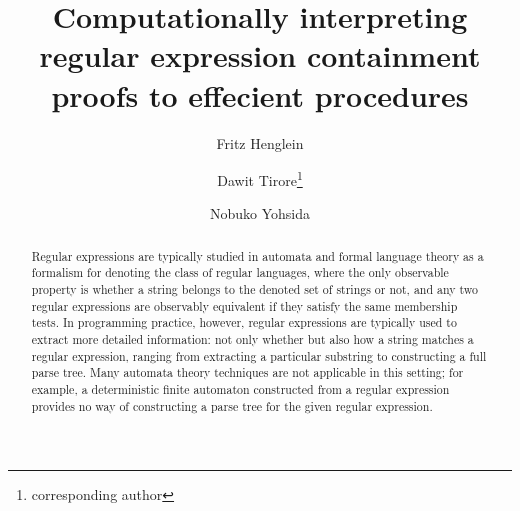 \documentclass[a4paper,UKenglish,cleveref, autoref, thm-restate]{lipics-v2021}
\title{Computationally interpreting regular expression containment proofs to effecient procedures } %
\author{Fritz Henglein}{University of Copenhagen, Denmark}{johnqpublic@dummyuni.org}{https://orcid.org/0000-0002-1825-0097}{(Optional) author-specific funding acknowledgements}%
\author{Dawit Tirore\footnote{corresponding author}}{IT University of Copenhagen, Dummy College, [optional: Address], Country}{dati@itu.dk}{[orcid]}{[funding]}
\author{Nobuko Yohsida}{University of Oxford}{mail}{[orcid]}{}
\begin{document}


\maketitle

\begin{abstract}
 Regular expressions are typically studied in automata and formal language theory as a formalism for denoting the class of regular languages, where the only observable property is whether a string belongs to the denoted set of strings or not, and any two regular expressions are observably equivalent if they satisfy the same membership tests.  In programming practice, however, regular expressions are typically used to extract more detailed information: not only whether but also how a string matches a regular expression, ranging from extracting a particular substring to constructing a full parse tree. Many automata theory techniques are not applicable in this setting; for example, a deterministic finite automaton constructed from a regular expression provides no way of constructing a parse tree for the given regular expression.  


\end{abstract}
\end{document}
